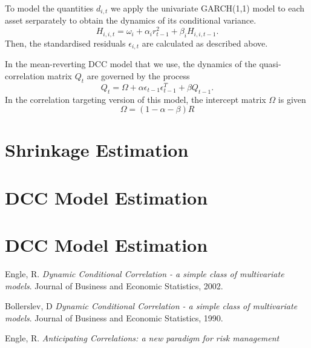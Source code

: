 \documentclass{article} %
\numberwithin{equation}{section} %
\numberwithin{figure}{section} %
\numberwithin{table}{section} %
\begin{document}
To model the quantities $d_{i,t}$ we apply the univariate GARCH(1,1) model to each asset serparately to obtain the dynamics of its conditional variance.
\begin{equation}
  H_{i,i,t} = \omega_i + \alpha_i r_{t-1}^2 + \beta_i H_{i,i,t-1}.
\end{equation}
 Then, the standardised residuals $\epsilon _{i,t}$ are calculated as described above.

In the mean-reverting DCC model that we use, the dynamics of the quasi-correlation matrix $Q_t$ are governed by the process
\begin{equation}
  Q_t = \Omega + \alpha \epsilon_{t-1}\epsilon_{t-1}^T + \beta Q_{t-1}.
\end{equation}
In the correlation targeting version of this model, the intercept matrix $\Omega$ is given
\begin{equation}
  \Omega = (1 - \alpha - \beta)R
\end{equation}


\section{Shrinkage Estimation}\label{section: shrinkage}

\section{DCC Model Estimation}\label{section: shrinkage}

\section{DCC Model Estimation}\label{section: shrinkage}

\begin{thebibliography}{9}
Engle, R.
\textit{Dynamic Conditional Correlation - a simple class of multivariate models}.
Journal of Business and Economic Statistics, 2002.

Bollerslev, D
\textit{Dynamic Conditional Correlation - a simple class of multivariate models}.
Journal of Business and Economic Statistics, 1990.

Engle, R.
\textit{Anticipating Correlations: a new paradigm for risk management}
\end{thebibliography}
\end{document}
